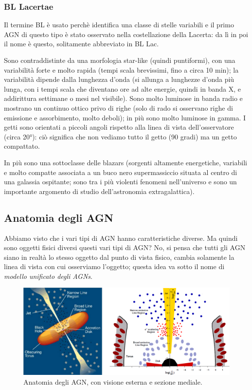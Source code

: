 \subsubsection{BL Lacertae} 
Il termine BL è usato perchè identifica una classe di stelle variabili e il primo AGN di questo tipo è stato osservato nella costellazione della Lacerta: da lì in poi il nome è questo, solitamente abbreviato in BL Lac. 

Sono contraddistinte da una morfologia star-like (quindi puntiformi), con una variabilità forte e molto rapida (tempi scala brevissimi, fino a circa 10 min); la variabilità dipende dalla lunghezza d’onda (si allunga a lunghezze d’onda più lunga, con i tempi scala che diventano ore ad alte energie, quindi in banda X, e addirittura settimane o mesi nel visibile). Sono molto luminose in banda radio e mostrano un continuo ottico privo di righe (solo di rado si osservano righe di emissione e assorbimento, molto deboli); in più sono molto luminose in gamma. I getti sono orientati a piccoli angoli rispetto alla linea di vista dell’osservatore (circa 20°): ciò significa che non vediamo tutto il getto (90 gradi) ma un getto compattato.

In più sono una sottoclasse delle blazars (sorgenti altamente energetiche, variabili e molto compatte associata a un buco nero supermassiccio situata al centro di una galassia ospitante; sono tra i più violenti fenomeni nell'universo e sono un importante argomento di studio dell'astronomia extragalattica).

\subsection{Anatomia degli AGN}
Abbiamo visto che i vari tipi di AGN hanno caratteristiche diverse. Ma quindi sono oggetti fisici diversi questi vari tipi di AGN? No, si pensa che tutti gli AGN siano in realtà lo stesso oggetto dal punto di vista fisico, cambia solamente la linea di vista con cui osserviamo l’oggetto; questa idea va sotto il nome di \emph{modello unificato degli AGNs}.

\begin{figure}
    \centering
    \includegraphics[width = \textwidth]{immagini/sezione-e-anatomia-agn.png}
    \caption{Anatomia degli AGN, con visione esterna e sezione mediale.}
    \label{fig:sezione-e-anatomia-agn}
\end{figure}

